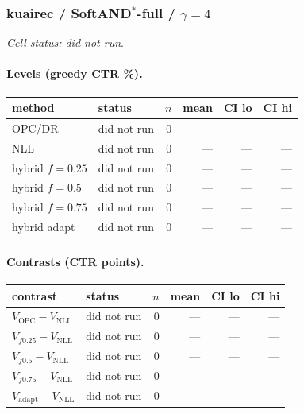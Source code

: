 \documentclass[10pt,a4paper]{article}
\begin{document}
\subsubsection{kuairec / SoftAND$^*$-full / $\gamma=4$}
\emph{Cell status: did not run}.
\paragraph{Levels (greedy CTR \%).}
{\centering\small\begin{tabular}{llrrrr}
\toprule method & status & $n$ & mean & CI lo & CI hi \\
\midrule
OPC/DR & did not run & 0 & --- & --- & --- \\
NLL & did not run & 0 & --- & --- & --- \\
hybrid $f{=}0.25$ & did not run & 0 & --- & --- & --- \\
hybrid $f{=}0.5$ & did not run & 0 & --- & --- & --- \\
hybrid $f{=}0.75$ & did not run & 0 & --- & --- & --- \\
hybrid adapt & did not run & 0 & --- & --- & --- \\
\bottomrule\end{tabular}\par}
\paragraph{Contrasts (CTR points).}
{\centering\small\begin{tabular}{llrrrr}
\toprule contrast & status & $n$ & mean & CI lo & CI hi \\
\midrule
$V_{\mathrm{OPC}}-V_{\mathrm{NLL}}$ & did not run & 0 & --- & --- & --- \\
$V_{f0.25}-V_{\mathrm{NLL}}$ & did not run & 0 & --- & --- & --- \\
$V_{f0.5}-V_{\mathrm{NLL}}$ & did not run & 0 & --- & --- & --- \\
$V_{f0.75}-V_{\mathrm{NLL}}$ & did not run & 0 & --- & --- & --- \\
$V_{\mathrm{adapt}}-V_{\mathrm{NLL}}$ & did not run & 0 & --- & --- & --- \\
\bottomrule\end{tabular}\par}
\end{document}
